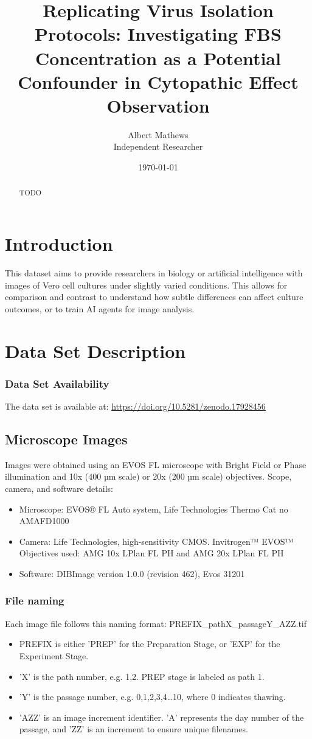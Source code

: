 \documentclass[12pt,a4paper]{article}
\title{\textbf{Replicating Virus Isolation Protocols: Investigating FBS Concentration as a Potential Confounder in Cytopathic Effect Observation}}
\author{Albert Mathews \\ Independent Researcher}
\date{\today}
\begin{document}
\maketitle

\begin{abstract}
TODO
\end{abstract}

\section{Introduction}
This dataset aims to provide researchers in biology or artificial intelligence with images of Vero cell cultures under slightly varied conditions. This allows for comparison and contrast to understand how subtle differences can affect culture outcomes, or to train AI agents for image analysis. 

\section{Data Set Description}
\subsubsection{Data Set Availability}
The data set is available at: \url{https://doi.org/10.5281/zenodo.17928456}
\subsection{Microscope Images}
Images were obtained using an EVOS FL microscope with Bright Field or Phase illumination and 10x (400 µm scale) or 20x (200 µm scale) objectives. Scope, camera, and software details:
\begin{itemize}
    \item Microscope: EVOS® FL Auto system, Life Technologies Thermo Cat no AMAFD1000
    \item Camera: Life Technologies, high-sensitivity CMOS. Invitrogen™ EVOS™ Objectives used: AMG 10x LPlan FL PH and AMG 20x LPlan FL PH
    \item Software: DIBImage version 1.0.0 (revision 462), Evos 31201
\end{itemize}

\subsubsection{File naming}

Each image file follows this naming format: PREFIX\_pathX\_passageY\_AZZ.tif
\begin{itemize}
    \item PREFIX is either 'PREP' for the Preparation Stage, or 'EXP' for the Experiment Stage.
    \item 'X' is the path number, e.g. 1,2. PREP stage is labeled as path 1.
    \item 'Y' is the passage number, e.g. 0,1,2,3,4…10, where 0 indicates thawing.
    \item 'AZZ' is an image increment identifier. 'A' represents the day number of the passage, and 'ZZ' is an increment to ensure unique filenames.
\end{itemize}
\end{document}
